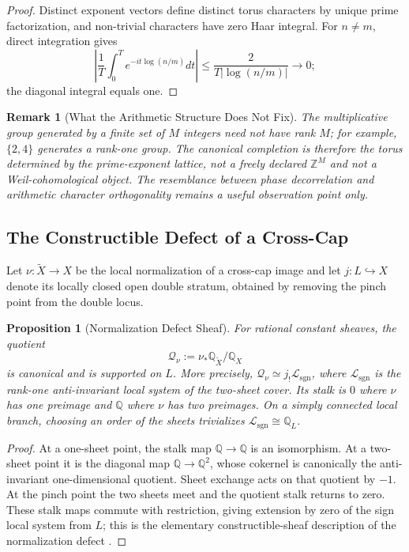 \documentclass[11pt]{article}
\newtheorem{proposition}[theorem]{Proposition}
\newtheorem{remark}[theorem]{Remark}
\begin{document}
\begin{proof}
Distinct exponent vectors define distinct torus characters by unique prime
factorization, and non-trivial characters have zero Haar integral.  For
$n\ne m$, direct integration gives
\[
 \left|\frac1T\int_0^T e^{-it\log(n/m)}dt\right|
 \le\frac{2}{T|\log(n/m)|}\longrightarrow0;
\]
the diagonal integral equals one.
\end{proof}

\begin{remark}[What the Arithmetic Structure Does Not Fix]
The multiplicative group generated by a finite set of $M$ integers need not
have rank $M$; for example, $\{2,4\}$ generates a rank-one group.  The canonical
completion is therefore the torus determined by the prime-exponent lattice,
not a freely declared $\mathbb Z^M$ and not a Weil-cohomological object.
The resemblance between phase decorrelation and arithmetic character
orthogonality remains a useful observation point only.
\end{remark}

\subsection{The Constructible Defect of a Cross-Cap}

Let $\nu:\widetilde X\to X$ be the local normalization of a cross-cap image and
let $j:L\hookrightarrow X$ denote its locally closed open double stratum,
obtained by removing the pinch point from the double locus.

\begin{proposition}[Normalization Defect Sheaf]
\label{prop:normalization_defect}
For rational constant sheaves, the quotient
\[
  \mathcal Q_\nu
  :=\nu_*\mathbb Q_{\widetilde X}/\mathbb Q_X
\]
is canonical and is supported on $L$.  More precisely,
$\mathcal Q_\nu\simeq j_!\mathcal L_{\mathrm{sgn}}$, where
$\mathcal L_{\mathrm{sgn}}$ is the rank-one anti-invariant local system of the
two-sheet cover.  Its stalk is $0$ where $\nu$ has one preimage and
$\mathbb Q$ where $\nu$ has two preimages.  On a simply connected local branch,
choosing an order of the sheets trivializes
$\mathcal L_{\mathrm{sgn}}\cong\mathbb Q_L$.
\end{proposition}

\begin{proof}
At a one-sheet point, the stalk map
$\mathbb Q\to\mathbb Q$ is an isomorphism.  At a two-sheet point it is the
diagonal map $\mathbb Q\to\mathbb Q^2$, whose cokernel is canonically the
anti-invariant one-dimensional quotient.  Sheet exchange acts on that quotient
by $-1$.  At the pinch point the two sheets meet and the quotient stalk returns
to zero.  These stalk maps commute with restriction, giving extension by zero
of the sign local system from $L$; this is the elementary
constructible-sheaf description of the normalization defect
\cite{Treumann2009,MaximSchurmann2026}.
\end{proof}
\end{document}

